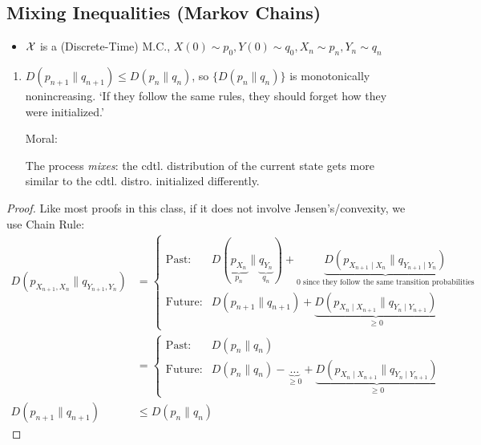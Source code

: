 \subsection{Mixing Inequalities (Markov Chains)}
\begin{itemize}
    \item $\mathcal{X}$ is a (Discrete-Time) M.C., $X(0)\sim p_0, Y(0)\sim q_0, X_n\sim p_n, Y_n\sim q_n$
\end{itemize}
\begin{enumerate}
    \item $D(p_{n+1} \| q_{n+1}) \leq D(p_n \| q_n)$, so $\{D(p_n\|q_n)\}$ is monotonically nonincreasing. `If they follow the same rules, they should forget how they were initialized.'
    
    Moral: 
    \begin{shaded}
    The process \textit{mixes}: the cdtl. distribution of the current state gets more similar to the cdtl. distro. initialized differently.
    \end{shaded}
\end{enumerate}
\begin{proof}
Like most proofs in this class, if it does not involve Jensen's/convexity, we use Chain Rule:
\begin{align*}
D(p_{X_{n+1}, X_n} \| q_{Y_{n+1}, Y_n}) 
&= \begin{cases}
    \text{Past:}
    & 
    D(\underbrace{p_{X_n}}_{p_n} \| \underbrace{q_{Y_n}}_{q_n}) + \underbrace{D(p_{X_{n+1} \mid X_n} \| q_{Y_{n+1}\mid Y_n})}_{0 \text{ since they follow the same transition probabilities}}
    \\
    \text{Future:}
    & 
    D(%
    {p_{{n+1}}}
    \| %
    {q_{{n+1}}}
    ) + \underbrace{D(p_{X_{n} \mid X_{n+1}} \| q_{Y_{n}\mid Y_{n+1}})}_{\geq0}
\end{cases}
\\
&= \begin{cases}
    \text{Past:}
    & 
    D(p_n\|q_n)
    \\
    \text{Future:}
    & 
    D(%
    {p_{{n}}}
    \| %
    {q_{{n}}}
    ) 
    - \underbrace{\ldots}_{\geq0}
    + \underbrace{D(p_{X_{n} \mid X_{n+1}} \| q_{Y_{n}\mid Y_{n+1}})}_{\geq0}
\end{cases}
\\
D(%
    {p_{{n+1}}}
    \| %
    {q_{{n+1}}}
    )
    &\leq 
    D(%
    {p_{{n}}}
    \| %
    {q_{{n}}}
    ) 
\end{align*}
\end{proof}


